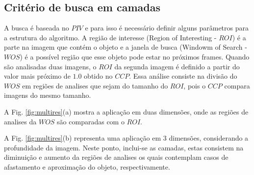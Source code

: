 \subsection{Critério de busca em camadas}

A busca é baseada no $PIV$ e para isso é necessário definir alguns parâmetros para a estrutura 
do algoritmo. A região de interesse (Region of Interesting - $ROI$) é a parte na imagem que contém
o objeto e a janela de busca (Windowm of Search - $WOS$) é a possível região que esse objeto pode estar
no próximos frames. Quando são analisadas duas imagens, o $ROI$ da segunda imagem é definido a partir do
valor mais próximo de $1.0$ obtido no $CCP$. 
Essa análise consiste na divisão do $WOS$ em regiões de analises que sejam do tamanho do $ROI$, pois o $CCP$
compara imagens do mesmo tamanho.

A Fig. \ref{fig:multires}(a) mostra a aplicação em duas dimensões, onde as regiões de analises da $WOS$
são comparadas com o $ROI$. 

A Fig. \ref{fig:multires}(b) representa uma aplicação em 3 dimensões, considerando a profundidade
da imagem. Neste ponto, inclui-se as camadas, estas consistem na diminuição e aumento da regiões de analises os quais 
contemplam casos de afastamento e aproximação do objeto, respectivamente.

